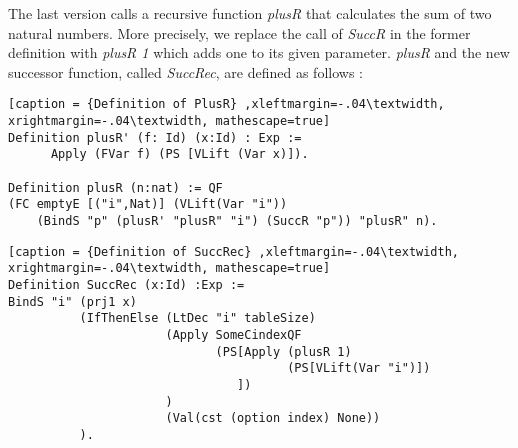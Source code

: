 The last version calls a recursive function \textit{plusR} that calculates the sum of two natural numbers. More precisely, we replace the call of \textit{SuccR} in the former definition with \textit{plusR 1} which adds one to its given parameter. \textit{plusR} and the new successor function, called \textit{SuccRec}, are defined as follows : 
\begin{lstlisting}[caption = {Definition of PlusR} ,xleftmargin=-.04\textwidth,
xrightmargin=-.04\textwidth, mathescape=true]
Definition plusR' (f: Id) (x:Id) : Exp :=
      Apply (FVar f) (PS [VLift (Var x)]). 
      
Definition plusR (n:nat) := QF 
(FC emptyE [("i",Nat)] (VLift(Var "i")) 
    (BindS "p" (plusR' "plusR" "i") (SuccR "p")) "plusR" n).
\end{lstlisting}  
\pagebreak 
\begin{lstlisting}[caption = {Definition of SuccRec} ,xleftmargin=-.04\textwidth,
xrightmargin=-.04\textwidth, mathescape=true]
Definition SuccRec (x:Id) :Exp :=
BindS "i" (prj1 x) 
          (IfThenElse (LtDec "i" tableSize) 
                      (Apply SomeCindexQF 
                             (PS[Apply (plusR 1) 
                                       (PS[VLift(Var "i")])
                                ])
                      ) 
                      (Val(cst (option index) None))
          ).
\end{lstlisting} \vspace{4pt}

